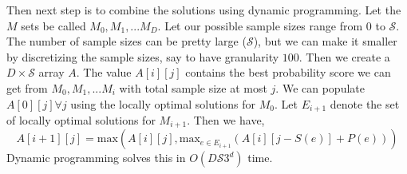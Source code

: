 \documentclass[10pt,journal,compsoc]{IEEEtran}
\newcounter{prob}
\begin{document}
{Then next step is to combine the solutions using dynamic programming. Let the $M$ sets be called $M_0, M_1, ... M_D$. Let our possible sample sizes range from $0$ to $\mathcal{S}$. The number of sample sizes can be pretty large ($\mathcal{S}$), but we can make it smaller by discretizing the sample sizes, say to have granularity $100$. Then we create a $D \times \mathcal{S}$ array $A$. The value $A\left[i\right]\left[j\right]$ contains the best probability score we can get from $M_0, M_1, ... M_i$ with total sample size at most $j$. We can populate $A\left[0\right]\left[j\right] \forall j$ using the locally optimal solutions for $M_0$. Let $E_{i+1}$ denote the set of locally optimal solutions for $M_{i+1}$. Then we have,
$$A\left[i+1\right] \left[j \right] = \textrm{max} (A\left[i\right]\left[j\right], \textrm{max}_{e \in E_{i+1}}(A\left[i\right]\left[j-S(e)\right] + P(e)))$$
Dynamic programming solves this in $O(D\mathcal{S}3^d)$ time. 
}
\end{document}
